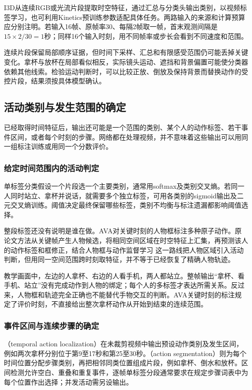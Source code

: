 I3D从连续RGB或光流片段提取时空特征，通过汇总与分类头输出类别，以视频标签学习，也可利用Kinetics预训练参数适配具体任务。两路输入的来源和计算预算应分别注明。若输入16帧、原帧率30、每隔2帧取一帧，首末观测间隔是$15\times2/30=1$秒；同样16个输入时刻，用不同帧率或步长会看到不同速度和范围。

连续片段保留局部顺序证据，但时间下采样、汇总和有限感受范围仍可能丢掉关键变化。拿杯与放杯在局部看似相反，实际镜头运动、遮挡和背景偏置可能使分类器依赖其他线索。检验运动判断时，可以比较正放、倒放及保持背景而替换动作的受控片段，结果须按具体模型确认。

\subsection{活动类别与发生范围的确定}
\label{sec:vision-video-activity-output}

已经取得时间特征后，输出还可能是一个范围的类别、某个人的动作标签、若干事件区间，或者每个时刻的步骤。网络都在处理视频，并不意味着这些输出可以用同一组标注训练或用同一个分数评价。

\subsubsection{给定时间范围内的活动判定}
\label{sec:vision-video-clip-label}

单标签分类假设一个片段选一个主要类别，通常用softmax及类别交叉熵。若同一人同时站立、拿杯并说话，就需要多个独立标签，可用各类别的sigmoid输出及二元交叉熵训练。阈值决定最终保留哪些标签，类别不均衡与标注遗漏都影响阈值选择。

整段标签还没有说明是谁在做。AVA对关键时刻的人物框标注多种原子动作。原论文方法从关键帧产生人物候选，将相同空间区域在时空特征上汇集，再预测该人的动作标签和框修正，结合人物框与动作监督学习 这一路线把人物区域引入活动判断，但用同一空间范围跨时刻取特征，并不等于已经恢复了精确人物轨迹。

教学画面中，左边的人拿杯、右边的人看手机，两人都站立。整帧输出“拿杯、看手机、站立”没有完成动作到人物的绑定；每个人的多标签才表达所需关系。反过来，人物框和轨迹完全正确也不能替代手物交互的判断。AVA关键时刻的标注规定了评价时刻，不直接给出整次拿杯动作从开始到结束的连续范围。

\subsubsection{事件区间与连续步骤的确定}
\label{sec:vision-video-temporal-boundaries}

（temporal action localization）在未裁剪视频中输出预设动作类别及发生区间，例如两次拿杯分别位于第9至17秒和第25至30秒。（action segmentation）则为每个时间位置分配步骤类别，再把相邻同类位置组成片段，例如拿杯、倒水和放杯。区间检测允许空白、重叠和重复事件，逐帧单标签分段通常要求在规定步骤词表中为每个位置作出选择；并发活动需另设输出。

